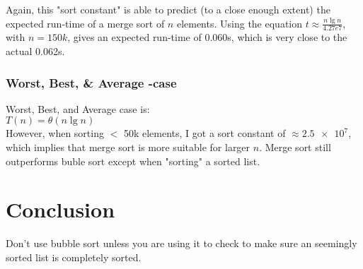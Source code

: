 \documentclass{article}
\begin{document}
Again, this "sort constant" is able to predict (to a close enough extent) the expected run-time of a merge sort of $n$ elements.
Using the equation $t \approx \frac{n \lg{n}}{4.27e7}$, with $n = 150k$, gives an expected run-time of 0.060s, which is 
very close to the actual 0.062s.

\subsubsection{Worst, Best, \& Average -case}

Worst, Best, and Average case is: \\

	$T(n) = \theta (n \lg{n})$ \\

However, when sorting $<$ 50k elements, I got a sort constant of $\approx \num{2.5e7}$, which implies that merge sort is more
suitable for larger $n$. Merge sort still outperforms buble sort except when "sorting" a sorted list.


\section{Conclusion}

Don't use bubble sort unless you are using it to check to make sure an seemingly sorted list is completely sorted.
\end{document}
